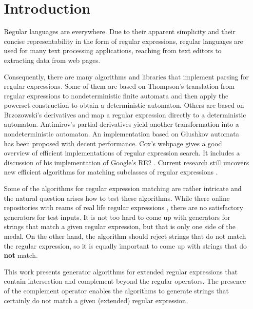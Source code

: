 \section{Introduction}

Regular languages are everywhere. Due to their apparent simplicity and
their concise representability in the form of regular expressions,
regular languages are used for many text processing
applications, reaching from text editors
\cite{DBLP:journals/cacm/Thompson68} to extracting data from web
pages.

Consequently, there are many algorithms and libraries that implement
parsing for regular expressions. Some of them are based on Thompson's
translation from regular expressions to nondeterministic finite
automata and then apply the powerset construction to obtain a
deterministic automaton. Others are based on Brzozowski's derivatives
\cite{Brzozowski1964} and
map a regular expression directly to a deterministic
automaton. Antimirov's partial derivatives \cite{Antimirov96Partial}
yield another transformation into a nondeterministic automaton. An
implementation based on Glushkov automata has been proposed
\cite{DBLP:conf/icfp/FischerHW10} with decent performance.
Cox's webpage \cite{cox07:_implem_regul_expres} gives a good overview
of efficient implementations of regular expression search. It includes
a discussion of his implementation of Google's RE2 \cite{cox10:_regul_expres_match_wild}.
Current research still uncovers new efficient algorithms for matching
subclasses of regular expressions \cite{DBLP:journals/jcss/GrozM17}.

Some of the algorithms for regular expression matching are rather
intricate and the natural question arises how to test these algorithms. 
While there online repositories with reams of real life regular
expressions \cite{regul_expres_librar}, there are no satisfactory
generators for test inputs. It is not too hard to come up with
generators for strings that match a given regular expression, but that
is only one side of the medal. On the other hand, the algorithm should
reject strings that do not match the regular expression, so it is
equally important to come up with strings that do \textbf{not} match.

This work presents generator algorithms for extended regular expressions that
contain intersection and complement beyond the regular operators. The
presence of the complement operator enables the algorithms to generate
strings that certainly do not match a given (extended) regular
expression.

